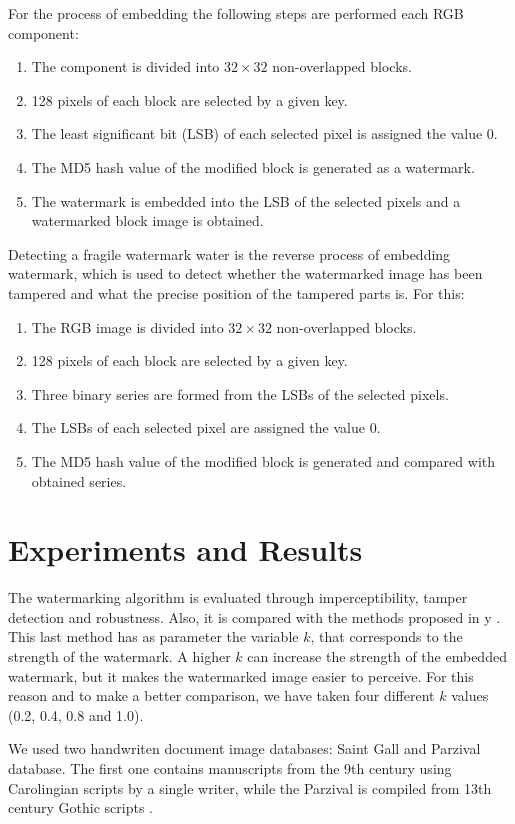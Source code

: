 \documentclass[runningheads]{llncs}
\begin{document}
For the process of embedding the following steps are performed each RGB component:
\begin{enumerate}
	\item The component is divided into $32\times 32$ non-overlapped blocks.
	\item 128 pixels of each block are selected by a given key.
	\item The least significant bit (LSB) of each selected pixel is assigned the value 0.
	\item The MD5 hash value of the modified block is generated as a watermark.
	\item The watermark is embedded into the LSB of the selected pixels and a watermarked block image is obtained.  
\end{enumerate}    

Detecting a fragile watermark water is the reverse process of embedding watermark, which is used to detect whether the watermarked image has been tampered and what the precise position of the tampered parts is. For this:
\begin{enumerate}
	\item The RGB image is divided into $32\times 32$ non-overlapped blocks.
	\item 128 pixels of each block are selected by a given key.
	\item Three binary series are formed from the LSBs of the selected pixels.
	\item The LSBs of each selected pixel are assigned the value 0.
	\item The MD5 hash value of the modified block is generated and compared with obtained series.
\end{enumerate}

\section{Experiments and Results}
The watermarking algorithm is evaluated through imperceptibility, tamper detection and robustness. Also, it is compared with the methods proposed in \cite{shivani2017dual} y \cite{liu2018blind}. This last method has as parameter the variable $k$, that corresponds to the strength of the watermark. A higher $k$ can increase the strength of the embedded watermark, but it makes the watermarked image easier to perceive. For this reason and to make a better comparison, we have taken four different $k$ values (0.2, 0.4, 0.8 and 1.0).   

We used two handwriten document image databases: Saint Gall \cite{fischer2011transcription} and Parzival \cite{fischer2009automatic} database. The first one contains manuscripts from the 9th century using Carolingian scripts by a single writer, while the Parzival is compiled from 13th century Gothic scripts \cite{pastor2016complete}.
 
\end{document}
